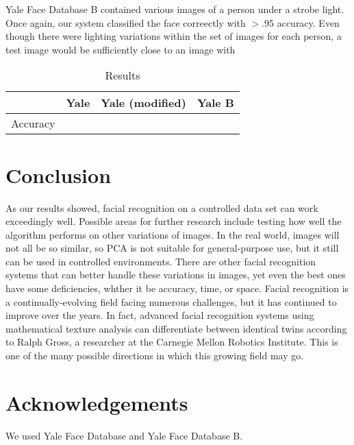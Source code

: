 \documentclass[letterpaper]{article}
\begin{document}
Yale Face Database B contained various images of a person under a strobe light.  Once again, our system classified the face correectly with $>.95$ accuracy.  Even though there were lighting variations within the set of images for each person, a test image would be sufficiently close to an image with 
\begin{table}
\begin{center}
\caption{Results}
\begin {tabular} {|c|c|c|c|}
\hline
& \textrm{Yale} & \textrm{Yale (modified)} & \textrm{Yale B}\\
\hline
Accuracy &  &  &  \\
\hline
\end {tabular}
\end{center}
\end{table}
\section{Conclusion}
As our results showed, facial recognition on a controlled data set can work exceedingly well. Possible areas for further research include testing how well the algorithm performs on other variations of images.  In the real world, images will not all be so similar, so PCA is not suitable for general-purpose use, but it still can be used in controlled environments.  There are other facial recognition systems that can better handle these variations in images, yet even the best ones have some deficiencies, whther it be accuracy, time, or space.  Facial recognition is a continually-evolving field facing numerous challenges, but it has continued to improve over the years.  In fact, advanced facial recognition systems using mathematical texture analysis can differentiate between identical twins according to Ralph Gross, a researcher at the Carnegie Mellon Robotics Institute. This is one of the many possible directions in which this growing field may go.
\section{Acknowledgements}
We used Yale Face Database and Yale Face Database B.


\end{document}

